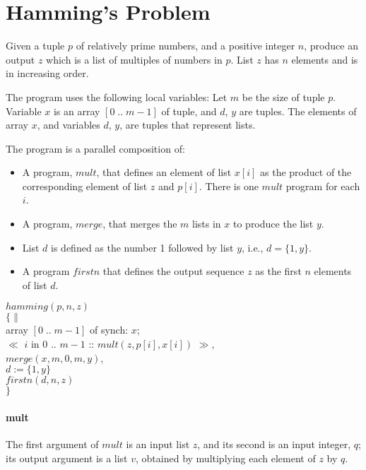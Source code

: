 \section{ Hamming's Problem}
Given a tuple $p$ of relatively prime numbers, and a positive integer
$n$, produce an output $z$ which is a list of multiples of numbers in $p$.
List $z$ has $n$ elements and is in increasing order.

The program uses the following local variables: 
Let $m$ be the size of tuple $p$.
Variable $x$ is an array $[ 0 \; .. \; m-1]$ of tuple, and $d$, $y$ are tuples.
The elements of array $x$, and variables $d$, $y$, are tuples that represent
lists.

\vspace{5cm}


The program is a parallel composition of:
\begin{itemize}
   \item A program, $mult$, that 
         defines an element of list $x[i]$ as the product of 
         the corresponding element of list $z$ and $p[i]$.
         There is one $mult$ program for each $i$.
   \item A program, $merge$, that merges the $m$ lists in $x$ to
         produce the list $y$. 
   \item List $d$ is defined as the number 1 followed by list $y$,
         i.e., $d = \{1,y\}$.
   \item A program $firstn$ that defines the output sequence $z$ as
         the first $n$ elements of list  $d$.
\end{itemize}

\vspace{5mm}

\begin{tabbing}
$hamming(p,n,z)$ \\ 
$\{\|$ \= \\ 
 \> array $[0 \; .. \; m-1]$ of synch: $x$; \\
 \>   $\ll$ $i$ in $0$ .. $m-1$ :: $mult(z,p[i],x[i])$ $\gg$, \\
 \>   $merge(x,m,0,m,y)$, \\
 \>   $d := \{1,y\}$ \\
 \>   $firstn(d,n,z)$ \\
$\}$ \\
\end{tabbing}

\paragraph{mult}
The first argument of $mult$ is an input list $z$, 
and its second is an input integer, $q$;
its output argument is a list $v$, obtained by multiplying each element
of $z$ by $q$.

